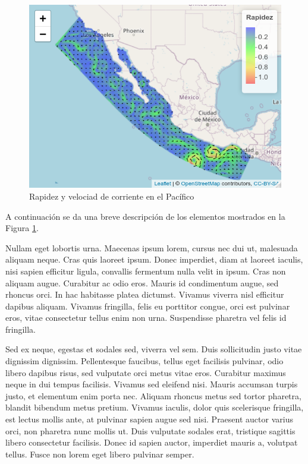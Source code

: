 \documentclass[
]{article}
\begin{document}
\begin{figure}
\includegraphics[width=0.95\linewidth]{images/pacifico01} \caption{Rapidez y velociad de corriente en el Pacífico}\label{fig:Mapa01}
\end{figure}

A continuación se da una breve descripción de los elementos mostrados en la Figura \ref{fig:Mapa01}.

Nullam eget lobortis urna. Maecenas ipsum lorem, cursus nec dui ut, malesuada aliquam neque. Cras quis laoreet ipsum. Donec imperdiet, diam at laoreet iaculis, nisi sapien efficitur ligula, convallis fermentum nulla velit in ipsum. Cras non aliquam augue. Curabitur ac odio eros. Mauris id condimentum augue, sed rhoncus orci. In hac habitasse platea dictumst. Vivamus viverra nisl efficitur dapibus aliquam. Vivamus fringilla, felis eu porttitor congue, orci est pulvinar eros, vitae consectetur tellus enim non urna. Suspendisse pharetra vel felis id fringilla.

Sed ex neque, egestas et sodales sed, viverra vel sem. Duis sollicitudin justo vitae dignissim dignissim. Pellentesque faucibus, tellus eget facilisis pulvinar, odio libero dapibus risus, sed vulputate orci metus vitae eros. Curabitur maximus neque in dui tempus facilisis. Vivamus sed eleifend nisi. Mauris accumsan turpis justo, et elementum enim porta nec. Aliquam rhoncus metus sed tortor pharetra, blandit bibendum metus pretium. Vivamus iaculis, dolor quis scelerisque fringilla, est lectus mollis ante, at pulvinar sapien augue sed nisi. Praesent auctor varius orci, non pharetra nunc mollis ut. Duis vulputate sodales erat, tristique sagittis libero consectetur facilisis. Donec id sapien auctor, imperdiet mauris a, volutpat tellus. Fusce non lorem eget libero pulvinar semper.
\end{document}
